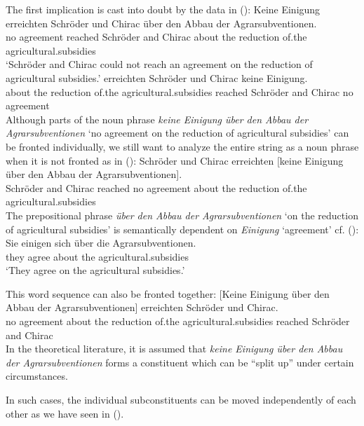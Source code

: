 The first implication is cast into doubt by the data in ():
\eal
\ex
\gll Keine Einigung erreichten Schröder und Chirac über den Abbau der Agrarsubventionen.\footnotemark\\
     no agreement reached Schröder and Chirac about the reduction of.the agricultural.subsidies\\
\glt `Schröder and Chirac could not reach an agreement on the reduction of agricultural subsidies.'
\ex 
{}     erreichten Schröder und Chirac keine Einigung.\\
     \spacebr{}about the reduction of.the agricultural.subsidies reached    Schröder and Chirac no agreement\\
\zl
Although parts of the noun phrase \emph{keine Einigung über den Abbau der Agrarsubventionen} `no agreement on the reduction
of agricultural subsidies' can be fronted individually, we still want to analyze the entire string as a noun phrase when it
is not fronted as in ():
\ea
\gll Schröder und Chirac erreichten [keine Einigung über den Abbau der Agrarsubventionen].\\
     Schröder and Chirac reached    \spacebr{}no agreement about the reduction of.the agricultural.subsidies\\
\z
\addlines[2]
The prepositional phrase \emph{über den Abbau der Agrarsubventionen} `on the reduction of agricultural subsidies' is semantically
dependent on \emph{Einigung} `agreement' cf. ():
\ea
\gll Sie einigen sich über die Agrarsubventionen.\\
     they agree  about the agricultural.subsidies\\
\glt `They agree on the agricultural subsidies.'
\z


This word sequence can also be fronted together:
\ea
\gll {}[Keine Einigung über den Abbau der Agrarsubventionen] erreichten Schröder und Chirac.\\
     \spacebr{}no agreement about the reduction of.the agricultural.subsidies  reached Schröder and Chirac\\
\z
In the theoretical literature, it is assumed that \emph{keine Einigung über den Abbau
  der Agrarsubventionen} forms a constituent which can be ``split up'' under certain circumstances.
\pagebreak

\noindent
In such cases, the individual subconstituents can be moved independently of each other \citep{deKuthy2002a} as we have seen in (). 

